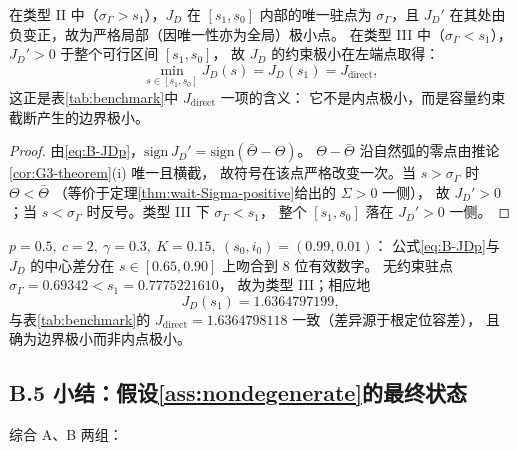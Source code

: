 \begin{proposition}[严格极小与可行性截断]
\label{prop:JD-min}
在类型 II 中（$\sigma_\Gamma>s_1$），$J_D$ 在 $[s_1,s_0]$ 内部的唯一驻点为
$\sigma_\Gamma$，且 $J_D'$ 在其处由负变正，故为严格局部（因唯一性亦为全局）极小点。
在类型 III 中（$\sigma_\Gamma<s_1$），$J_D'>0$ 于整个可行区间 $[s_1,s_0]$，
故 $J_D$ 的约束极小在左端点取得：
\begin{equation}
  \min_{s\in[s_1,s_0]}J_D(s)=J_D(s_1)=J_{\mathrm{direct}} ,
  \label{eq:B-Jdirect}
\end{equation}
这正是表\ref{tab:benchmark}中 $J_{\mathrm{direct}}$ 一项的含义：
它不是内点极小，而是容量约束截断产生的边界极小。
\end{proposition}

\begin{proof}
由\eqref{eq:B-JDp}，$\mathrm{sign}\,J_D'=\mathrm{sign}(\bar\Theta-\Theta)$。
$\Theta-\bar\Theta$ 沿自然弧的零点由推论\ref{cor:G3-theorem}(i) 唯一且横截，
故符号在该点严格改变一次。当 $s>\sigma_\Gamma$ 时 $\Theta<\bar\Theta$
（等价于定理\ref{thm:wait-Sigma-positive}给出的 $\Sigma>0$ 一侧），
故 $J_D'>0$；当 $s<\sigma_\Gamma$ 时反号。类型 III 下 $\sigma_\Gamma<s_1$，
整个 $[s_1,s_0]$ 落在 $J_D'>0$ 一侧。
\end{proof}

\begin{remark}[基准参数下的数值核对]
$p=0.5,\ c=2,\ \gamma=0.3,\ K=0.15,\ (s_0,i_0)=(0.99,0.01)$：
公式\eqref{eq:B-JDp}与 $J_D$ 的中心差分在 $s\in[0.65,0.90]$ 上吻合到 $8$ 位有效数字。
无约束驻点 $\sigma_\Gamma=0.69342<s_1=0.7775221610$，
故为类型 III；相应地
\[
  J_D(s_1)=1.6364797199 ,
\]
与表\ref{tab:benchmark}的 $J_{\mathrm{direct}}=1.6364798118$ 一致（差异源于根定位容差），
且确为边界极小而非内点极小。
\end{remark}


\subsection*{B.5 小结：假设\ref{ass:nondegenerate}的最终状态}

综合 A、B 两组：

